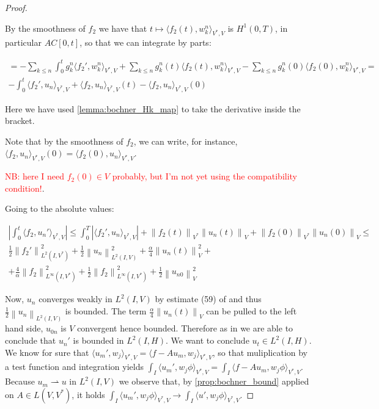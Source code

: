 \documentclass[english,a4paper,12pt,oneside]{scrbook}
\theoremstyle{break}
\newenvironment{mproof}[1][\proofname]{%
  \begin{proof}[#1]$ $\par\nobreak\ignorespaces
}{%
  \end{proof}
}
\renewcommand*{\proofname}{Proof}
\theoremstyle{remark}
\newcommand{\norm}[1]{\left\lVert#1\right\rVert}
\newcommand{\VN}[1]{\norm{#1}_{V}}
\newcommand{\VSN}[1]{\norm{#1}_{V^*}}
\newcommand{\tred}[1]{\textcolor{red}{#1}}
\begin{document}
\begin{mproof}
By the smoothness of $f_2$ we have that $t \mapsto \langle f_2(t),w_k^n \rangle_{V^*,V}$ is $H^1(0,T)$, in particular $AC[0,t]$, so that we can integrate by parts:

\begin{align*}
	 = - \sum_{k\leq n}\int_0^tg_k^{n}\langle f_2',w_k^n \rangle_{V^*,V} + \sum_{k\leq n} g_k^{n}(t)\langle f_2(t),w_k^n \rangle_{V^*,V} - \sum_{k\leq n} g_k^{n}(0)\langle f_2(0),w_k^n \rangle_{V^*,V} = \\
	 -\int_0^t \langle f_2',u_n \rangle_{V^*,V} + \langle f_2,u_n \rangle_{V^*,V}(t)-\langle f_2,u_n \rangle_{V^*,V}(0)
\end{align*}

Here we have used \cref{lemma:bochner_Hk_map} to take the derivative inside the bracket.

Note that by the smoothness of $f_2$, we can write, for instance, $\langle f_2,u_n \rangle_{V^*,V}(0) = \langle f_2(0),u_n \rangle_{V^*,V}$.

\tred{NB: here I need $f_2(0) \in V$ probably, but I'm not yet using the compatibility condition!}.

Going to the absolute values:

\begin{align*}
	\left | \int_0^t \langle f_2,u_n' \rangle_{V^*,V}\right | \leq 
	\int_0^T |\langle f_2',u_n \rangle_{V^*,V}|+ \VSN{f_2(t)}\VN{u_n(t)}+\VSN{f_2(0)}\VN{u_n(0)} \leq \\
	\frac{1}{2}\norm{f_2'}_{L^2(I,V^*)}^2 + \frac{1}{2}\norm{u_n}_{L^2(I,V)}^2 + \frac{\alpha}{4}\VN{u_n(t)}^2 +\\
	+ \frac{4}{\alpha}\norm{f_2}_{L^\infty(I,V^*)}^2+ \frac{1}{2}\norm{f_2}_{L^\infty(I,V^*)}^2+\frac{1}{2}\VN{u_{n0}}^2
\end{align*}

Now, $u_n$ converges weakly in $L^2(I,V)$ by estimate (59) of \cite{gilardi} and thus $\frac{1}{2}\norm{u_n}_{L^2(I,V)}$ is bounded. The term $\frac{\alpha}{4}\VN{u_n(t)}$ can be pulled to the left hand side, $u_{0n}$ is $V$ convergent hence bounded. Therefore as in \cite{gilardi} we are able to conclude that $u_n'$ is bounded in $L^2(I,H)$. We want to conclude $u_t \in L^2(I,H)$. We know for sure that $\langle u_m',w_j\rangle_{V^*,V}=\langle f-Au_m,w_j\rangle_{V^*,V}$, so that muliplication by a test function and integration yields $\int_I \langle u_m',w_j\phi\rangle_{V^*,V}=\int_I \langle f-Au_m,w_j\phi\rangle_{V^*,V}$. Because $u_m\rightharpoonup u$ in $L^2(I,V)$ we observe that, by \cref{prop:bochner_bound} applied on $A \in L(V,V^*)$, it holds $\int_I \langle u_m',w_j\phi\rangle_{V^*,V}\rightarrow \int_I \langle u',w_j\phi\rangle_{V^*,V}$.


\end{mproof}
\end{document}
